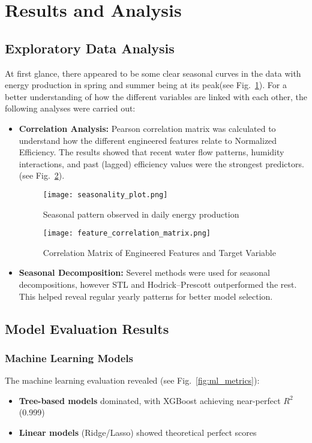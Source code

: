 \documentclass[12pt]{article}
\begin{document}
\section{Results and Analysis}
\label{sec:results}
\subsection{Exploratory Data Analysis}
\label{sec:eda}
At first glance, there appeared to be some clear seasonal curves in the data with energy production in spring and summer being at its peak(see Fig.~\ref{fig:seasonality}). For a better understanding of how the different variables are linked with each other, the following analyses were carried out:

\begin{itemize}
    \item \textbf{Correlation Analysis:} Pearson correlation matrix was calculated to understand how the different engineered features relate to Normalized Efficiency. The results showed that recent water flow patterns, humidity interactions, and past (lagged) efficiency values were the strongest predictors. (see Fig.~\ref{fig:correlation}).

    \begin{figure}[H]
    \centering
    \texttt{[image: seasonality\_plot.png]}
    \caption{Seasonal pattern observed in daily energy production}
    \label{fig:seasonality}
    \end{figure}

    \begin{figure}[H]
    \centering
    \texttt{[image: feature\_correlation\_matrix.png]}
    \caption{Correlation Matrix of Engineered Features and Target Variable}
    \label{fig:correlation}
    \end{figure}
    
    \item \textbf{Seasonal Decomposition:} Severel methods were used for seasonal decompositions, however STL and Hodrick–Prescott outperformed the rest. This helped reveal regular yearly patterns for better model selection.
\end{itemize}

\subsection{Model Evaluation Results}
\label{sec:ml}

\subsubsection{Machine Learning Models}
\label{sec:mlml}
The machine learning evaluation revealed (see Fig.~\ref{fig:ml_metrics}):
\begin{itemize}
    \item \textbf{Tree-based models} dominated, with XGBoost achieving near-perfect $R^2$ (0.999) \cite{chen2016xgboost}
    \item \textbf{Linear models} (Ridge/Lasso) showed theoretical perfect scores \cite{chen2016xgboost}
\end{itemize}
\end{document}

